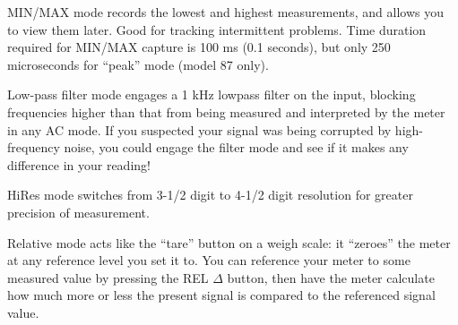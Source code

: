 












MIN/MAX mode records the lowest and highest measurements, and allows you to view them later.  Good for tracking intermittent problems.  Time duration required for MIN/MAX capture is 100 ms (0.1 seconds), but only 250 microseconds for ``peak'' mode (model 87 only).

\vskip 10pt

Low-pass filter mode engages a 1 kHz lowpass filter on the input, blocking frequencies higher than that from being measured and interpreted by the meter in any AC mode.  If you suspected your signal was being corrupted by high-frequency noise, you could engage the filter mode and see if it makes any difference in your reading!

\vskip 10pt

HiRes mode switches from 3-1/2 digit to 4-1/2 digit resolution for greater precision of measurement.

\vskip 10pt

Relative mode acts like the ``tare'' button on a weigh scale: it ``zeroes'' the meter at any reference level you set it to.  You can reference your meter to some measured value by pressing the REL $\Delta$ button, then have the meter calculate how much more or less the present signal is compared to the referenced signal value.




